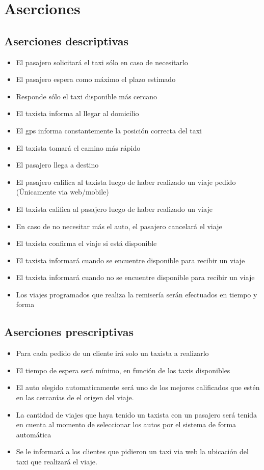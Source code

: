 \documentclass[a4paper]{article}
\begin{document}
\section{Aserciones}

\subsection{Aserciones descriptivas}

\begin{itemize}

\item El pasajero solicitar\'a el taxi s\'olo en caso de necesitarlo
\item El pasajero espera como m\'aximo el plazo estimado
\item Responde s\'olo el taxi disponible m\'as cercano
\item El taxista informa al llegar al domicilio
\item El gps informa constantemente la posici\'on correcta del taxi
\item El taxista tomar\'a el camino m\'as r\'apido
\item El pasajero llega a destino
\item El pasajero califica al taxista luego de haber realizado un viaje pedido (\'Unicamente via web/mobile)
\item El taxista califica al pasajero luego de haber realizado un viaje
\item En caso de no necesitar m\'as el auto, el pasajero cancelar\'a el viaje
\item El taxista confirma el viaje si est\'a disponible
\item El taxista informar\'a cuando se encuentre disponible para recibir un viaje
\item El taxista informar\'a cuando no se encuentre disponible para recibir un viaje
\item Los viajes programados que realiza la remiser\'ia ser\'an efectuados en tiempo y forma
\end{itemize}


\subsection{Aserciones prescriptivas}

\begin{itemize}
\item Para cada pedido de un cliente ir\'a solo un taxista a realizarlo
\item El tiempo de espera ser\'a m\'inimo, en funci\'on de los taxis disponibles
\item El auto elegido automaticamente ser\'a uno de los mejores calificados que est\'en en las cercan\'ias de el origen del viaje.
\item La cantidad de viajes que haya tenido un taxista con un pasajero ser\'a tenida en cuenta al momento de seleccionar los autos por el sistema de forma autom\'atica
\item Se le informar\'a a los clientes que pidieron un taxi via web la ubicaci\'on del taxi que realizar\'a el viaje.
 
\end{itemize}
\end{document}
